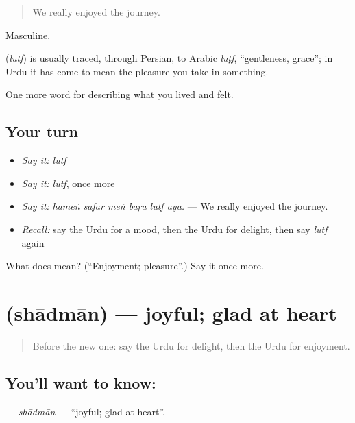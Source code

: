 \begin{quote}
We really enjoyed the journey.
\end{quote}

Masculine.

\begin{cousinweb}
\textbf{} (\emph{lutf}) is usually traced, through Persian, to Arabic \emph{luṭf}, \textquotedblleft{}gentleness, grace\textquotedblright{}; in Urdu it has come to mean the pleasure you take in something.
\end{cousinweb}

\begin{grammarlens}[title={What you've built}]
One more word for describing what you lived and felt.
\end{grammarlens}

\subsection*{Your turn}
\begin{itemize}
\raggedright
  \item \emph{Say it:} \emph{lutf}
  \item \emph{Say it:} \emph{lutf}, once more
  \item \emph{Say it:} \emph{hameṅ safar meṅ baṛā lutf āyā.} — We really enjoyed the journey.
  \item \emph{Recall:} say the Urdu for a mood, then the Urdu for delight, then say \emph{lutf} again
\end{itemize}

\begin{tcolorbox}[breakable,colback=teal!4,colframe=teal!35!black,title={Before you move on}]
What does  mean? (\textquotedblleft{}Enjoyment; pleasure\textquotedblright{}.) Say it once more.
\end{tcolorbox}
\section[\texorpdfstring{\ur{شادمان} (shādmān)}{شادمان (shādmān)}]{ (shādmān) — joyful; glad at heart}

\label{lesson:UR-C441-shadman}



\begin{quote}
Before the new one: say the Urdu for delight, then the Urdu for enjoyment.
\end{quote}

\subsection*{You'll want to know: }
\textbf{} — \emph{shādmān} — \textquotedblleft{}joyful; glad at heart\textquotedblright{}.

